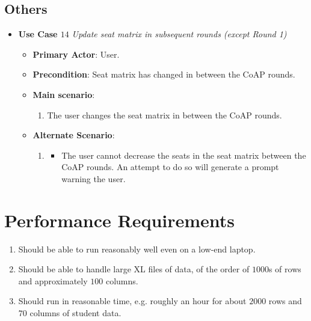 \documentclass{report}
\begin{document}
\subsection{Others}
\begin{tcolorbox}[colframe=white, colback=lightgreen, arc=8pt]

\begin{itemize}
    \item \textbf{Use Case $14$} \textit{Update seat matrix in subsequent rounds (except Round 1)
}\\
    \begin{itemize}
        \item \textbf{Primary Actor}: User.
        \item \textbf{Precondition}: Seat matrix has changed in between the CoAP rounds.
        \item \textbf{Main scenario}: \begin{enumerate}
            \item The user changes the seat matrix in between the CoAP rounds. 
        \end{enumerate}
       \item \textbf{Alternate Scenario}: 
       \begin{enumerate}
           \item 
           \begin{itemize}
               \item The user cannot decrease the seats in the seat matrix between the CoAP rounds. An attempt to do so will generate a prompt warning the user.
           \end{itemize}
       \end{enumerate}
    \end{itemize}
\end{itemize}

\end{tcolorbox}

\section{Performance Requirements}
\begin{enumerate}
    \item Should be able to run reasonably well even on a low-end laptop.
    \item Should be able to handle large XL files of data, of the order of $1000$s of rows and approximately $100$ columns.
    \item Should run in reasonable time, e.g. roughly an hour for about $2000$ rows and $70$ columns of student data.
\end{enumerate}
\end{document}

